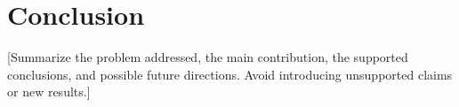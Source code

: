 \section{Conclusion}\label{sec:conclusion}
[Summarize the problem addressed, the main contribution, the supported
conclusions, and possible future directions. Avoid introducing unsupported
claims or new results.]
